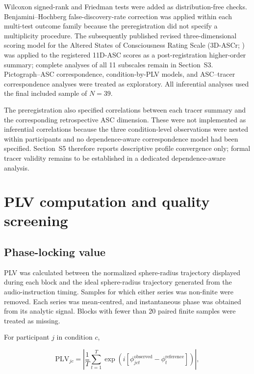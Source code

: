 \documentclass[pdflatex,sn-basic,lineno]{../sn-jnl}
\begin{document}
Wilcoxon signed-rank and Friedman tests were added as distribution-free checks. Benjamini--Hochberg false-discovery-rate correction was applied within each multi-test outcome family because the preregistration did not specify a multiplicity procedure. The subsequently published revised three-dimensional scoring model for the Altered States of Consciousness Rating Scale (3D-ASCr; \citealt{Stocker2025}) was applied to the registered 11D-ASC scores as a post-registration higher-order summary; complete analyses of all 11 subscales remain in Section~S3. Pictograph--ASC correspondence, condition-by-PLV models, and ASC--tracer correspondence analyses were treated as exploratory. All inferential analyses used the final included sample of $N=39$.

The preregistration also specified correlations between each tracer summary and the corresponding retrospective ASC dimension. These were not implemented as inferential correlations because the three condition-level observations were nested within participants and no dependence-aware correspondence model had been specified. Section~S5 therefore reports descriptive profile convergence only; formal tracer validity remains to be established in a dedicated dependence-aware analysis.

\section{PLV computation and quality screening}
\label{sec:supp_plv}

\subsection{Phase-locking value}

PLV was calculated between the normalized sphere-radius trajectory displayed during each block and the ideal sphere-radius trajectory generated from the audio-instruction timing. Samples for which either series was non-finite were removed. Each series was mean-centred, and instantaneous phase was obtained from its analytic signal. Blocks with fewer than 20 paired finite samples were treated as missing.

For participant $j$ in condition $c$,

\begin{equation}
\mathrm{PLV}_{jc}
=
\left|
\frac{1}{T}
\sum_{t=1}^{T}
\exp
\left(
i[
\phi^{\mathrm{observed}}_{jct}
-
\phi^{\mathrm{reference}}_{t}
]
\right)
\right|,
\end{equation}
\end{document}
